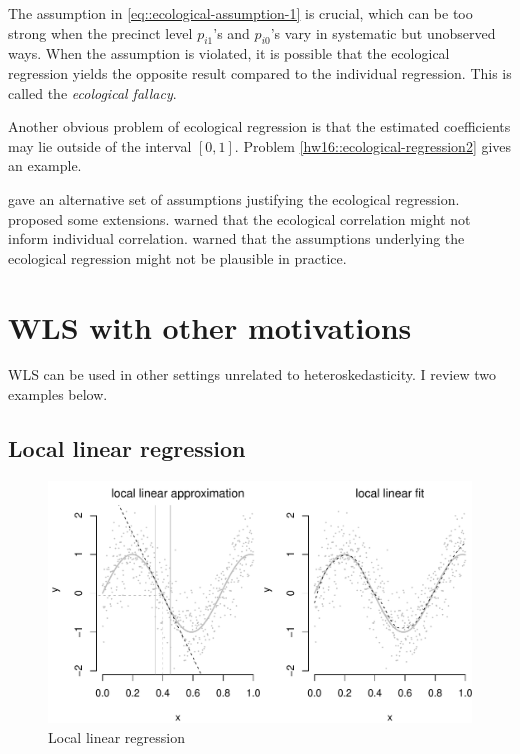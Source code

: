 The assumption in \eqref{eq::ecological-assumption-1} is crucial, which can be too strong when the precinct level $p_{i1}$'s and $p_{i0}$'s vary in systematic but unobserved ways. When the assumption is violated, it is possible that the ecological regression yields the opposite result compared to the individual regression. This is called the {\it ecological fallacy}. 

Another obvious problem of ecological regression is that the estimated coefficients may lie outside of the interval $[0,1]$. Problem \ref{hw16::ecological-regression2} gives an example. 

\citet{gelman2001models} gave an alternative set of assumptions justifying the ecological regression. \citet{king1997solution} proposed some extensions. \citet{robinson1950ecological}  warned that the ecological correlation might not inform individual correlation. \citet{freedman1991ecological} warned that the assumptions underlying the ecological regression might not be plausible in practice. 




\section{WLS with other motivations}

WLS can be used in other settings unrelated to heteroskedasticity. I review two examples below. 

\subsection{Local linear regression}

\begin{figure}
\includegraphics[width = \textwidth]{figures/localpolynomialplot}

\caption{Local linear regression}\label{fig::locallinearregression}
\end{figure}


